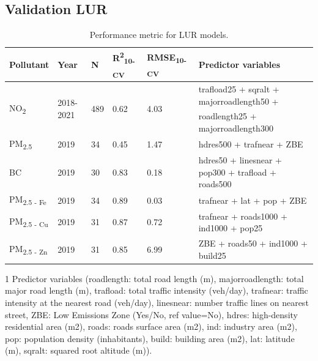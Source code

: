 \documentclass{article}
\begin{document}
\subsection{Validation LUR}
\begin{table}[ht]
\centering
\begin{threeparttable}
\caption{Performance metric for LUR models.}
\label{Table S3}
\begin{tabular}{llllll}
\toprule
\textbf{Pollutant} & \textbf{Year} & \textbf{N}  &   \textbf{R\textsuperscript{2}\textsubscript{10-CV}} & \textbf{RMSE\textsubscript{10-CV}} & \textbf{Predictor variables}\tnote{1} \\
\midrule
\multirow{2}{*}{NO\textsubscript{2}} & \multirow{2}{*}{2018-2021} & \multirow{2}{*}{489} & \multirow{2}{*}{0.62} & \multirow{2}{*}{4.03} & trafload25 + sqralt + majorroadlength50 + \\ 
 & & & & & roadlength25 + majorroadlength300 \\
\midrule
PM\textsubscript{2.5} & 2019 & 34 & 0.45 & 1.47 & hdres500 + trafnear + ZBE \\
\midrule
BC & 2019 & 30  & 0.83 & 0.18 & hdres50 + linesnear + pop300 + trafload + roads500 \\
\midrule
PM\textsubscript{2.5 - Fe} & 2019 & 34 & 0.89 & 0.03 & trafnear + lat + pop + ZBE  \\
\midrule
PM\textsubscript{2.5 - Cu} & 2019 & 31 & 0.87 & 0.72 & trafnear + roads1000 + ind1000 + pop25 \\
\midrule
PM\textsubscript{2.5 - Zn} & 2019 & 31  & 0.85 & 6.99 & ZBE + roads50 + ind1000 + build25  \\
\bottomrule
\end{tabular}
\begin{tablenotes}
\small
\item[1] Predictor variables (roadlength: total road length (m), majorroadlength: total major road length (m), trafload: total traffic intensity (veh/day), trafnear: traffic intensity at the nearest road (veh/day), linesnear: number traffic lines on nearest street, ZBE: Low Emissions Zone (Yes/No, ref value=No), hdres: high-density residential area (m2), roads: roads surface area (m2), ind: industry area (m2), pop: population density (inhabitants), build: building area (m2), lat: latitude (m), sqralt: squared root altitude (m)).
\end{tablenotes}
\end{threeparttable}
\end{table}
\end{document}
